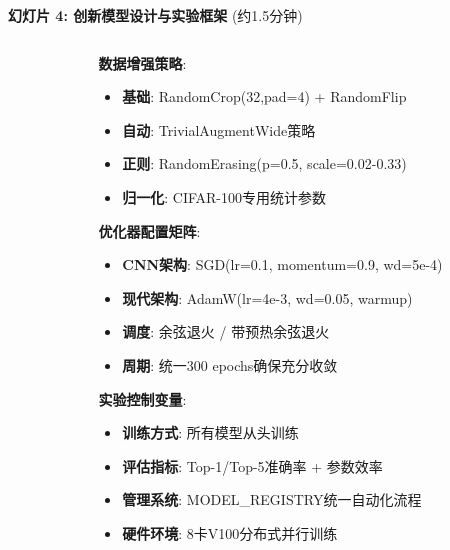 \documentclass[10pt]{beamer}
\begin{document}
\begin{frame}{\textbf{幻灯片 4: 创新模型设计与实验框架} (约1.5分钟)}
{\begin{columns}[T]
\begin{column}{0.48\textwidth}
        
    \end{column}
    \begin{column}{0.48\textwidth}
        \textbf{数据增强策略}:
        \begin{itemize}
            \item \textbf{基础}: RandomCrop(32,pad=4) + RandomFlip
            \item \textbf{自动}: TrivialAugmentWide策略
            \item \textbf{正则}: RandomErasing(p=0.5, scale=0.02-0.33)
            \item \textbf{归一化}: CIFAR-100专用统计参数
        \end{itemize}
        \textbf{优化器配置矩阵}:
        \begin{itemize}
            \item \textbf{CNN架构}: SGD(lr=0.1, momentum=0.9, wd=5e-4)
            \item \textbf{现代架构}: AdamW(lr=4e-3, wd=0.05, warmup)
            \item \textbf{调度}: 余弦退火 / 带预热余弦退火
            \item \textbf{周期}: 统一300 epochs确保充分收敛
        \end{itemize}
        \textbf{实验控制变量}:
        \begin{itemize}
            \item \textbf{训练方式}: 所有模型从头训练
            \item \textbf{评估指标}: Top-1/Top-5准确率 + 参数效率
            \item \textbf{管理系统}: MODEL\_REGISTRY统一自动化流程
            \item \textbf{硬件环境}: 8卡V100分布式并行训练
        \end{itemize}
    \end{column}
\end{columns}
}

\end{frame}
\end{document}
